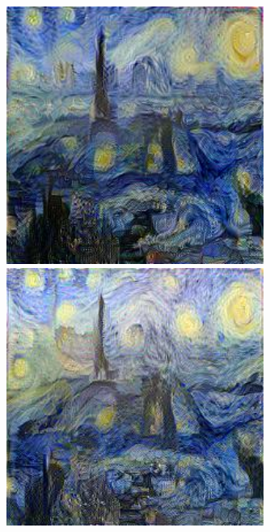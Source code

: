\documentclass{article}
\begin{document}
\begin{figure}[!htb]
\centering
\begin{minipage}{0.33\textwidth}
\centering
\includegraphics[width=0.75\textwidth]{../Images/transfer/paris_starrynight_1e4_500.jpg}
\end{minipage}%
\begin{minipage}{0.33\textwidth}
\centering
\includegraphics[width=0.75\textwidth]{../Images/transfer/paris_starrynight_MAX.jpg}
\end{minipage}%
\begin{minipage}{0.33\textwidth}
\centering

\end{minipage}
\end{figure}
\end{document}
